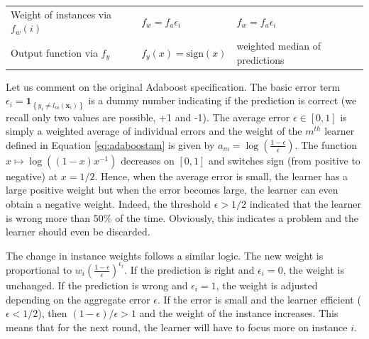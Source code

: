 \documentclass[]{krantz}
\theoremstyle{definition}
\theoremstyle{definition}
\theoremstyle{definition}
\theoremstyle{remark}
\begin{document}
\begin{longtable}[]{@{}lll@{}}
\begin{minipage}[t]{0.30\columnwidth}\raggedright
Weight of instances via \(f_w(i)\)\strut
\end{minipage} & \begin{minipage}[t]{0.30\columnwidth}\raggedright
\(f_w=f_a\epsilon_i\)\strut
\end{minipage} & \begin{minipage}[t]{0.30\columnwidth}\raggedright
\(f_w=f_a\epsilon_i\)\strut
\end{minipage}\tabularnewline
\begin{minipage}[t]{0.30\columnwidth}\raggedright
Output function via \(f_y\)\strut
\end{minipage} & \begin{minipage}[t]{0.30\columnwidth}\raggedright
\(f_y(x) = \text{sign}(x)\)\strut
\end{minipage} & \begin{minipage}[t]{0.30\columnwidth}\raggedright
weighted median of predictions\strut
\end{minipage}\tabularnewline
\bottomrule
\end{longtable}

Let us comment on the original Adaboost specification. The basic error
term
\(\epsilon_i=\textbf{1}_{\left\{y_i\neq l_m(\textbf{x}_i) \right\}}\) is
a dummy number indicating if the prediction is correct (we recall only
two values are possible, +1 and -1). The average error
\(\epsilon\in [0,1]\) is simply a weighted average of individual errors
and the weight of the \(m^{th}\) learner defined in Equation
\eqref{eq:adaboostam} is given by
\(a_m=\log\left(\frac{1-\epsilon}{\epsilon} \right)\). The function
\(x\mapsto \log((1-x)x^{-1})\) decreases on \([0,1]\) and switches sign
(from positive to negative) at \(x=1/2\). Hence, when the average error
is small, the learner has a large positive weight but when the error
becomes large, the learner can even obtain a negative weight. Indeed,
the threshold \(\epsilon>1/2\) indicated that the learner is wrong more
than 50\% of the time. Obviously, this indicates a problem and the
learner should even be discarded.

The change in instance weights follows a similar logic. The new weight
is proportional to
\(w_i\left(\frac{1-\epsilon}{\epsilon} \right)^{\epsilon_i}\). If the
prediction is right and \(\epsilon_i=0\), the weight is unchanged. If
the prediction is wrong and \(\epsilon_i=1\), the weight is adjusted
depending on the aggregate error \(\epsilon\). If the error is small and
the learner efficient (\(\epsilon<1/2\)), then
\((1-\epsilon)/\epsilon>1\) and the weight of the instance increases.
This means that for the next round, the learner will have to focus more
on instance \(i\).
\end{document}
